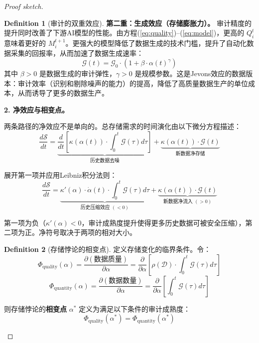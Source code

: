\documentclass[12pt,a4paper]{ctexart}
\theoremstyle{definition}
\newtheorem{definition}{Definition}[section]
\theoremstyle{remark}
\begin{document}
\begin{proof}[Proof sketch]
\begin{definition}[审计的双重效应]
\textbf{第二重：生成效应（存储膨胀力）。} 审计精度的提升同时改善了下游AI模型的性能。由方程(\ref{eq:quality})–(\ref{eq:model})，更高的 $Q_i^t$ 意味着更好的 $M_i^{t+1}$。更强大的模型降低了数据生成的技术门槛，提升了自动化数据采集的回报率，从而加速了数据生成速率：
\begin{equation}
\mathcal{G}(t) = \mathcal{G}_0 \cdot \left(1 + \beta \cdot \alpha(t)^{\gamma}\right)
\end{equation}
其中 $\beta > 0$ 是数据生成的审计弹性，$\gamma > 0$ 是规模参数。这是Jevons效应的数据版本：审计效率（识别和剔除噪声的能力）的提高，降低了高质量数据生产的单位成本，从而诱导了更多的数据生产。
\end{definition}

\medskip
\noindent\textbf{2. 净效应与相变点。}

两条路径的净效应不是单向的。总存储需求的时间演化由以下微分方程描述：
\begin{equation}
\frac{d\mathcal{S}}{dt} = \underbrace{\frac{d}{dt}\left[\kappa(\alpha(t)) \cdot \int_0^t \mathcal{G}(\tau) d\tau\right]}_{\text{历史数据去噪}} + \underbrace{\kappa(\alpha(t)) \cdot \mathcal{G}(t)}_{\text{新数据净存储}}
\end{equation}

展开第一项并应用Leibniz积分法则：
\begin{equation}
\frac{d\mathcal{S}}{dt} = \underbrace{\kappa'(\alpha) \cdot \dot{\alpha}(t) \cdot \int_0^t \mathcal{G}(\tau) d\tau}_{\text{历史压缩效应 }(<0)} + \underbrace{\kappa(\alpha(t)) \cdot \mathcal{G}(t)}_{\text{新数据净流入 }(>0)}
\end{equation}

第一项为负（$\kappa'(\alpha) < 0$，审计成熟度提升使得更多历史数据可被安全压缩），第二项为正。净符号取决于两项的相对大小。

\begin{definition}[存储悖论的相变点]
定义存储变化的临界条件。令：
\begin{equation}
\Phi_{\text{quality}}(\alpha) = \frac{\partial (\text{数据质量})}{\partial \alpha} = \frac{\partial}{\partial \alpha}\left[\rho(\mathcal{D}) \cdot \int_0^t \mathcal{G}(\tau) d\tau\right]
\end{equation}
\begin{equation}
\Phi_{\text{quantity}}(\alpha) = \frac{\partial (\text{数据数量})}{\partial \alpha} = \frac{\partial}{\partial \alpha}\left[\int_0^t \mathcal{G}(\tau) d\tau\right]
\end{equation}

则存储悖论的\textbf{相变点} $\alpha^*$ 定义为满足以下条件的审计成熟度：
\begin{equation}
\Phi_{\text{quality}}(\alpha^*) = \Phi_{\text{quantity}}(\alpha^*)
\end{equation}


\end{definition}
\end{proof}
\end{document}

